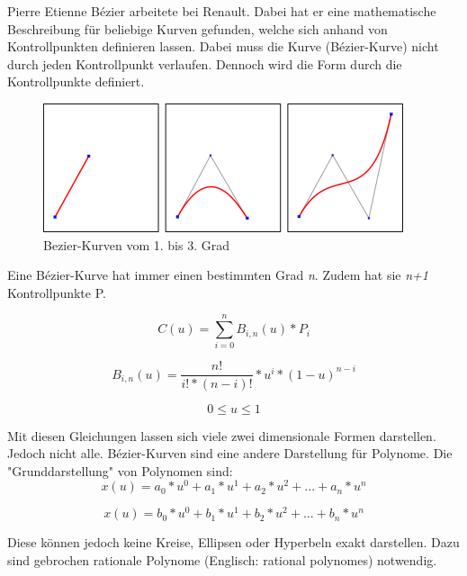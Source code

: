 \documentclass[11pt]{article}
\begin{document}
Pierre Etienne Bézier arbeitete bei Renault. 
Dabei hat er eine mathematische Beschreibung für beliebige Kurven gefunden, welche sich anhand von Kontrollpunkten definieren lassen.
Dabei muss die Kurve (Bézier-Kurve) nicht durch jeden Kontrollpunkt verlaufen. 
Dennoch wird die Form durch die Kontrollpunkte definiert.

\begin{figure}[h]
 \includegraphics{./pictures/Bezier_grad123.png}
\caption{Bezier-Kurven vom 1. bis 3. Grad}
\label{abb:bezierkurven123}
\end{figure}

Eine Bézier-Kurve hat immer einen bestimmten Grad \emph{n}. 
Zudem hat sie \emph{n+1} Kontrollpunkte P.

\begin{equation}
 C(u) = \sum_{i=0}^{n} B_{i,n} (u) * P_{i}
\end{equation}

\begin{equation}
 B_{i,n} (u) = \frac{n!}{i!*(n-i)!} * u^{i} * (1-u)^{n-i}
\end{equation}

\begin{equation}
 0 \leq u \leq 1
\end{equation}

Mit diesen Gleichungen lassen sich viele zwei dimensionale Formen darstellen.  
Jedoch nicht alle.
Bézier-Kurven sind eine andere Darstellung für Polynome. 
Die "Grunddarstellung" von Polynomen sind: 
 \begin{equation}
x(u) = a_{0} * u^{0} + a_{1} * u^{1} + a_{2} * u^{2} + ... + a_{n} * u^{n}
\end{equation}

\begin{equation}
x(u) = b_{0} * u^{0} + b_{1} * u^{1} + b_{2} * u^{2} + ... + b_{n} * u^{n}
\end{equation}

Diese können jedoch keine Kreise, Ellipsen oder Hyperbeln exakt darstellen. 
Dazu sind gebrochen rationale Polynome (Englisch: rational polynomes) notwendig. 
\end{document}
